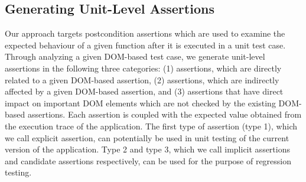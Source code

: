 \subsection{Generating Unit-Level Assertions} \label{Sec:unitLevelAssertion}
Our approach targets postcondition assertions which are used to examine the expected behaviour of a given function after it is executed in a unit test case.
Through analyzing a given DOM-based test case, we generate unit-level assertions in the following three categories: (1) assertions, which are directly related to a given DOM-based assertion, (2) assertions, which are indirectly affected by a given DOM-based assertion, and (3) assertions that have direct impact on important DOM elements which are not checked by the existing DOM-based assertions. Each assertion is coupled with the expected value obtained from the execution trace of the application. The first type of assertion (type 1), which we call explicit assertion, can potentially be used in unit testing of the current version of the application. Type 2 and type 3, which we call implicit assertions and candidate assertions respectively, can be used for the purpose of regression testing.



 